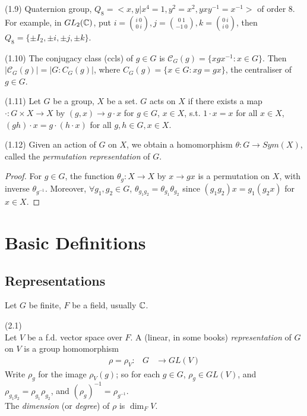 \documentclass[a4paper]{article}
\begin{document}
(1.9) Quaternion group, $Q_8 = <x,y|x^4 = 1, y^2 = x^2, yxy^{-1} = x^{-1}>$ of order $8$. For example, in $GL_2(\mathbb{C})$, put $i={{i\ 0} \choose {0 \ i}}, j = {{0 \ 1} \choose {-1 \ 0}}, k = {{0 \ i} \choose {i \ 0}}$, then $Q_8 = \{\pm I_2, \pm i, \pm j, \pm k\}$.

(1.10) The conjugacy class (ccls) of $g \in G$ is $\mathcal{C}_G(g) = \{xgx^{-1} : x \in G\}$. Then $|\mathcal{C}_G (g) | = |G:C_G(g)|$, where $C_G(g) = \{x \in G : xg = gx\}$, the centraliser of $g \in G$.

(1.11) Let $G$ be a group, $X$ be a set. $G$ acts on $X$ if there exists a map $\cdot: G \times X \to X$ by $(g,x) \to g\cdot x$ for $g \in G$, $x \in X$, s.t. $1 \cdot x = x$ for all $x \in X$, $(gh) \cdot x = g \cdot (h\cdot x)$ for all $g,h \in G, x \in X$.

(1.12) Given an action of $G$ on $X$, we obtain a homomorphism $\theta: G \to Sym(X)$, called the \emph{permutation representation} of $G$.
\begin{proof}
For $g \in G$, the function $\theta_g: X \to X$ by $x \to gx$ is a permutation on $X$, with inverse $\theta_{g^{-1}}$. Moreover, $\forall g_1,g_2 \in G$, $\theta_{g_1 g_2} = \theta_{g_1} \theta_{g_2}$ since $(g_1g_2) x = g_1(g_2 x)$ for $x \in X$.
\end{proof}

\newpage

\section{Basic Definitions}
\subsection{Representations}

Let $G$ be finite, $F$ be a field, usually $\mathbb{C}$.
\begin{defi} (2.1)\\
Let $V$ be a f.d. vector space over $F$. A (linear, in some books) \emph{representation} of $G$ on $V$ is a group homomorphism 
\begin{equation*}
\begin{aligned}
\rho = \rho_V: & G &\to GL(V)
\end{aligned}
\end{equation*}
Write $\rho_g$ for the image $\rho_V(g)$; so for each $g \in G$, $\rho_g \in GL(V)$, and $\rho_{g_1 g_2} = \rho_{g_1} \rho_{g_2}$, and $(\rho_g)^{-1} = \rho_{g^{-1}}$.\\
The \emph{dimension} (or \emph{degree}) of $\rho$ is $\dim_F V$.
\end{defi}
\end{document}

